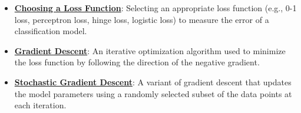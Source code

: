 \documentclass{article}%
\begin{document}
\begin{itemize}[leftmargin=*]
\item \href{https://purdue.brightspace.com/d2l/common/assets/pdfjs-d2l-dist/1.0.14-legacy/web/viewer.html?file=\%2Fcontent\%2Fenforced\%2F1095467-wl.202510.CS.24300.001\%2F05L2-ML Basics.pdf\%3Fou\%3D1095467\&lang=en-us\&container=d2l-fileviewer-rendered-pdf\&fullscreen=d2l-fileviewer-rendered-pdf-dialog\&height=667#page=25}{\textbf{Choosing a Loss Function}}: Selecting an appropriate loss function (e.g., 0{-}1 loss, perceptron loss, hinge loss, logistic loss) to measure the error of a classification model.%
\item \href{https://purdue.brightspace.com/d2l/common/assets/pdfjs-d2l-dist/1.0.14-legacy/web/viewer.html?file=\%2Fcontent\%2Fenforced\%2F1095467-wl.202510.CS.24300.001\%2F05L2-ML Basics.pdf\%3Fou\%3D1095467\&lang=en-us\&container=d2l-fileviewer-rendered-pdf\&fullscreen=d2l-fileviewer-rendered-pdf-dialog\&height=667#page=28}{\textbf{Gradient Descent}}: An iterative optimization algorithm used to minimize the loss function by following the direction of the negative gradient.%
\item \href{https://purdue.brightspace.com/d2l/common/assets/pdfjs-d2l-dist/1.0.14-legacy/web/viewer.html?file=\%2Fcontent\%2Fenforced\%2F1095467-wl.202510.CS.24300.001\%2F05L2-ML Basics.pdf\%3Fou\%3D1095467\&lang=en-us\&container=d2l-fileviewer-rendered-pdf\&fullscreen=d2l-fileviewer-rendered-pdf-dialog\&height=667#page=29}{\textbf{Stochastic Gradient Descent}}: A variant of gradient descent that updates the model parameters using a randomly selected subset of the data points at each iteration.%
\end{itemize}

%
\end{document}
